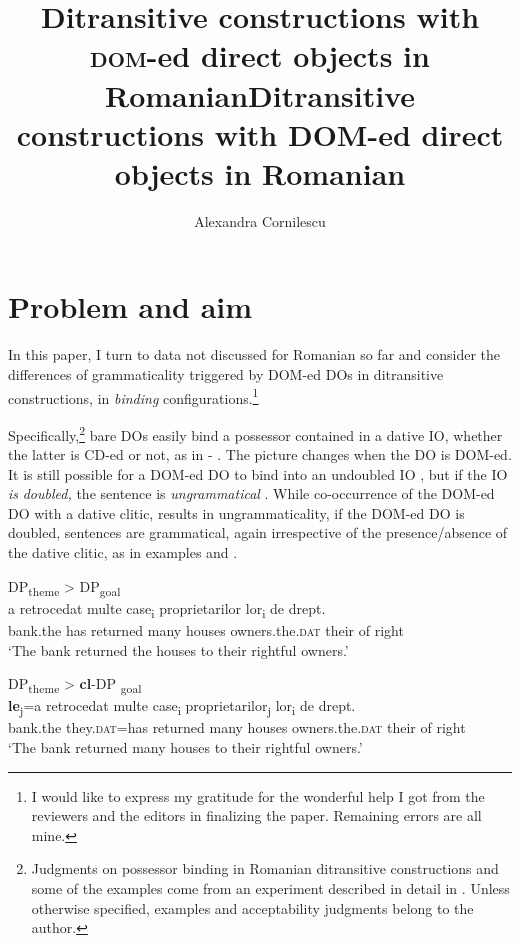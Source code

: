 \documentclass[output=paper,colorlinks,citecolor=brown,nonflat]{./langscibook}
\author{Alexandra Cornilescu\affiliation{University of Bucharest}}
\title{Ditransitive constructions with \textsc{dom}-ed direct objects in Romanian}
\title{Ditransitive constructions with DOM-ed direct objects in Romanian}
\begin{document}
\maketitle 


\section{Problem and aim} %

In this paper, I turn to data not discussed for Romanian so far and consider the differences of grammaticality triggered by DOM-ed DOs in ditransitive constructions, in \textit{binding} configurations.\footnote{I would like to express my gratitude for the wonderful help I got from the reviewers and the editors in finalizing the paper. Remaining errors are all mine.}

Specifically,\footnote{Judgments on possessor binding in Romanian ditransitive constructions and some of the examples come from an experiment described in detail in \citep{CornilescuDinuTigău2017Dative}. Unless otherwise specified, examples and acceptability judgments belong to the author.} bare DOs easily bind a possessor contained in a dative IO, whether the latter is CD-ed or not, as in  - . The picture changes when the DO is DOM-ed. It is still possible for a DOM-ed DO to bind into an undoubled IO , but if the IO \textit{is} \textit{doubled,} the sentence is \textit{ungrammatical} . While co-occurrence of the DOM-ed DO with a dative clitic, results in ungrammaticality, if the DOM-ed \textsc{DO} is doubled, sentences are grammatical, again irrespective of the presence/absence of the dative clitic, as in examples  and .

	\ea \label{ex:cornilescu:1} DP\textsubscript{theme} > DP\textsubscript{goal}\\ %
		  {a} {retrocedat}  {multe} {case\textsubscript{i}}  {proprietarilor}   {lor\textsubscript{i}}  {de} {drept.}\\
	bank.the has returned  many houses  owners.the.\textsc{dat} their of right\\
		\glt ‘The bank returned the houses to their rightful owners.’ \citep[162]{CornilescuDinuTigău2017DOC}
	\z


\ea %
    \label{ex:cornilescu:2}
    DP\textsubscript{theme} > \textbf{cl}-DP \textsubscript{goal}\\
     \textbf{{le}}{\textsubscript{j}}{=a} {retrocedat} {multe} {case\textsubscript{i}} {proprietarilor\textsubscript{j}} {lor\textsubscript{i}} {de} {drept.}\\
        bank.the they.\textsc{dat}=has returned many houses owners.the.\textsc{dat} their of right\\
    \glt ‘The bank returned many houses to their rightful owners.’ \citep[162]{CornilescuDinuTigău2017DOC}
    \z
\end{document}
